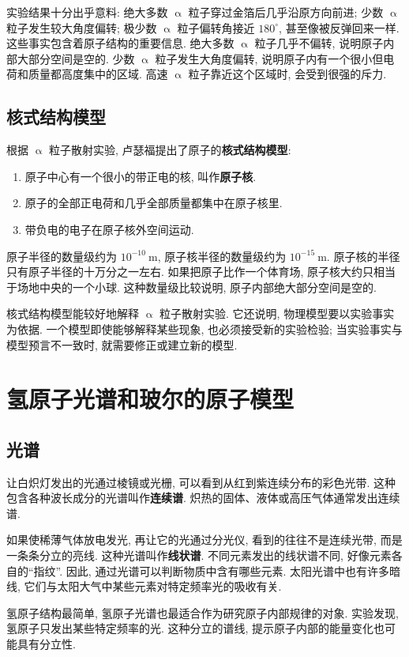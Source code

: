 \documentclass[UTF8,openany,fontset=fandol]{ctexbook}
\theoremstyle{chinesetextbook}
\newcommand{\unit}[1]{\ \mathrm{#1}}
\begin{document}
实验结果十分出乎意料: 绝大多数 $\upalpha$ 粒子穿过金箔后几乎沿原方向前进; 少数 $\upalpha$ 粒子发生较大角度偏转; 极少数 $\upalpha$ 粒子偏转角接近 $180^\circ$, 甚至像被反弹回来一样. 这些事实包含着原子结构的重要信息. 绝大多数 $\upalpha$ 粒子几乎不偏转, 说明原子内部大部分空间是空的. 少数 $\upalpha$ 粒子发生大角度偏转, 说明原子内有一个很小但电荷和质量都高度集中的区域. 高速 $\upalpha$ 粒子靠近这个区域时, 会受到很强的斥力.
\subsection{核式结构模型}
根据 $\upalpha$ 粒子散射实验, 卢瑟福提出了原子的\textbf{核式结构模型}:
\begin{enumerate}
\item 原子中心有一个很小的带正电的核, 叫作\textbf{原子核}.
\item 原子的全部正电荷和几乎全部质量都集中在原子核里.
\item 带负电的电子在原子核外空间运动.
\end{enumerate}

原子半径的数量级约为 $10^{-10}\unit{m}$, 原子核半径的数量级约为 $10^{-15}\unit{m}$. 原子核的半径只有原子半径的十万分之一左右. 如果把原子比作一个体育场, 原子核大约只相当于场地中央的一个小球. 这种数量级比较说明, 原子内部绝大部分空间是空的.

核式结构模型能较好地解释 $\upalpha$ 粒子散射实验. 它还说明, 物理模型要以实验事实为依据. 一个模型即使能够解释某些现象, 也必须接受新的实验检验; 当实验事实与模型预言不一致时, 就需要修正或建立新的模型.
\section{氢原子光谱和玻尔的原子模型}
\subsection{光谱}
让白炽灯发出的光通过棱镜或光栅, 可以看到从红到紫连续分布的彩色光带. 这种包含各种波长成分的光谱叫作\textbf{连续谱}. 炽热的固体、液体或高压气体通常发出连续谱.

如果使稀薄气体放电发光, 再让它的光通过分光仪, 看到的往往不是连续光带, 而是一条条分立的亮线. 这种光谱叫作\textbf{线状谱}. 不同元素发出的线状谱不同, 好像元素各自的“指纹”. 因此, 通过光谱可以判断物质中含有哪些元素. 太阳光谱中也有许多暗线, 它们与太阳大气中某些元素对特定频率光的吸收有关.

氢原子结构最简单, 氢原子光谱也最适合作为研究原子内部规律的对象. 实验发现, 氢原子只发出某些特定频率的光. 这种分立的谱线, 提示原子内部的能量变化也可能具有分立性.
\end{document}
